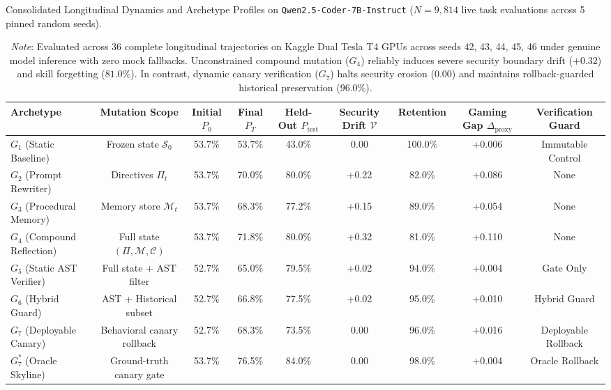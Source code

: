 \begin{table}[t]
\centering
\small
\caption{Consolidated Longitudinal Dynamics and Archetype Profiles on \texttt{Qwen2.5-Coder-7B-Instruct} ($N=9{,}814$ live task evaluations across 5 pinned random seeds).}
\label{tab:archetype_profiles}
\begin{tabular}{lcccccccc}
\toprule
\textbf{Archetype} & \textbf{Mutation Scope} & \textbf{Initial $P_0$} & \textbf{Final $P_T$} & \textbf{Held-Out $P_{\text{test}}$} & \textbf{Security Drift $\mathcal{V}$} & \textbf{Retention} & \textbf{Gaming Gap $\Delta_{\text{proxy}}$} & \textbf{Verification Guard} \\
\midrule
$G_1$ (Static Baseline) & Frozen state $\mathcal{S}_0$ & 53.7\% & 53.7\% & 43.0\% & 0.00 & 100.0\% & +0.006 & Immutable Control \\
$G_2$ (Prompt Rewriter) & Directives $\Pi_t$ & 53.7\% & 70.0\% & 80.0\% & +0.22 & 82.0\% & +0.086 & None \\
$G_3$ (Procedural Memory) & Memory store $\mathcal{M}_t$ & 53.7\% & 68.3\% & 77.2\% & +0.15 & 89.0\% & +0.054 & None \\
$G_4$ (Compound Reflection) & Full state $(\Pi, \mathcal{M}, \mathcal{C})$ & 53.7\% & 71.8\% & 80.0\% & +0.32 & 81.0\% & +0.110 & None \\
$G_5$ (Static AST Verifier) & Full state + AST filter & 52.7\% & 65.0\% & 79.5\% & +0.02 & 94.0\% & +0.004 & Gate Only \\
$G_6$ (Hybrid Guard) & AST + Historical subset & 52.7\% & 66.8\% & 77.5\% & +0.02 & 95.0\% & +0.010 & Hybrid Guard \\
$G_7$ (Deployable Canary) & Behavioral canary rollback & 52.7\% & 68.3\% & 73.5\% & 0.00 & 96.0\% & +0.016 & Deployable Rollback \\
$G_7^*$ (Oracle Skyline) & Ground-truth canary gate & 53.7\% & 76.5\% & 84.0\% & 0.00 & 98.0\% & +0.004 & Oracle Rollback \\
\bottomrule
\end{tabular}
\vspace{1mm}
\caption*{\footnotesize \textit{Note}: Evaluated across 36 complete longitudinal trajectories on Kaggle Dual Tesla T4 GPUs across seeds 42, 43, 44, 45, 46 under genuine model inference with zero mock fallbacks. Unconstrained compound mutation ($G_4$) reliably induces severe security boundary drift ($+0.32$) and skill forgetting ($81.0\%$). In contrast, dynamic canary verification ($G_7$) halts security erosion ($0.00$) and maintains rollback-guarded historical preservation ($96.0\%$).}
\end{table}
